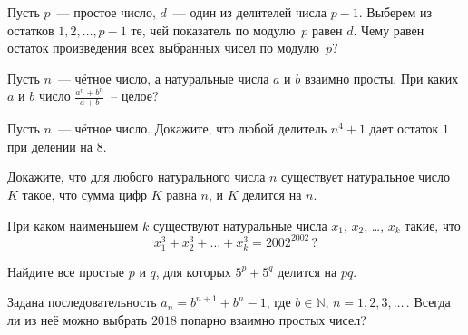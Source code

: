 


\begin{problems}

\item
Пусть $p$~--- простое число, $d$~--- один из делителей числа $p - 1$.
Выберем из остатков $1, 2, \ldots, p - 1$ те, чей показатель по модулю~$p$
равен $d$.
Чему равен остаток произведения всех выбранных чисел по модулю~$p$?

\item
Пусть $n$~--- чётное число, а натуральные числа $a$ и $b$ взаимно просты.
При каких $a$ и $b$ число $\frac{a^{n} + b^{n}}{a + b}$~-- целое?

\item
Пусть $n$~--- чётное число.
Докажите, что любой делитель $n^4 + 1$ дает остаток $1$ при делении на $8$.


\item
Докажите, что для любого натурального числа $n$ существует натуральное число
$K$ такое, что сумма цифр $K$ равна $n$, и $K$ делится на $n$.

\item
При каком наименьшем $k$ существуют натуральные числа
$x_{1}$, $x_{2}$, \ldots, $x_{k}$ такие, что
\[
    x_{1}^3 + x_{2}^3 + \ldots + x_{k}^3 = 2002^{2002}
\, ? \]

\item
Найдите все простые $p$ и $q$, для которых $5^{p} + 5^{q}$ делится на $p q$.

\item
Задана последовательность $a_{n} = b^{n+1} + b^{n} - 1$,
где $b \in \mathbb{N}$, $n = 1, 2, 3, \ldots$\,.
Всегда ли из неё можно выбрать $2018$ попарно взаимно простых чисел?

\end{problems}

